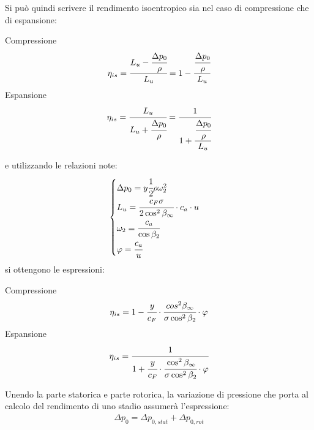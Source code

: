 Si può quindi scrivere il rendimento isoentropico sia nel caso di compressione che di espansione:
\begin{multicols}{2}
Compressione
\begin{align*}
\eta_{is} = \cfrac{L_u - \cfrac{\Delta p_0}{\rho}}{L_u} = 1- \cfrac{\cfrac{\Delta p_0}{\rho}}{L_u}
\end{align*}
\break
Espansione
\begin{align*}
\eta_{is} = \cfrac{L_u}{L_u + \cfrac{\Delta p_0}{\rho}} = \cfrac{1}{1+\cfrac{\cfrac{\Delta p_0}{\rho}}{L_u}}
\end{align*}
\end{multicols}
e utilizzando le relazioni note:
\begin{align*}
\begin{cases}
\Delta p_0 = y \cfrac{1}{2} \rho \omega_2^2\\
L_u = \cfrac{c_F \sigma}{2 \cos^2 \beta_{\infty}} \cdot c_a \cdot u\\
\omega_2 = \cfrac{c_a}{\cos \beta_2}\\
\varphi = \cfrac{c_a}{u}
\end{cases}
\end{align*}
si ottengono le espressioni:
\begin{multicols}{2}
Compressione
\begin{align*}
\eta_{is} = 1- \cfrac{y}{c_F} \cdot  \cfrac{cos^2 \beta_{\infty}}{\sigma \cos^2 \beta_2} \cdot \varphi
\end{align*}
\break
Espansione
\begin{align*}
\eta_{is} = \cfrac{1}{1+\cfrac{y}{c_F} \cdot \cfrac{\cos^2 \beta_{\infty}}{\sigma \cos^2 \beta_2} \cdot \varphi}
\end{align*}
\end{multicols}
Unendo la parte statorica e parte rotorica, la variazione di pressione che porta al calcolo del rendimento di uno stadio assumerà l'espressione:
\begin{align*}
\Delta p_0 = \Delta p_{0,stat} + \Delta p_{0,rot}
\end{align*}

